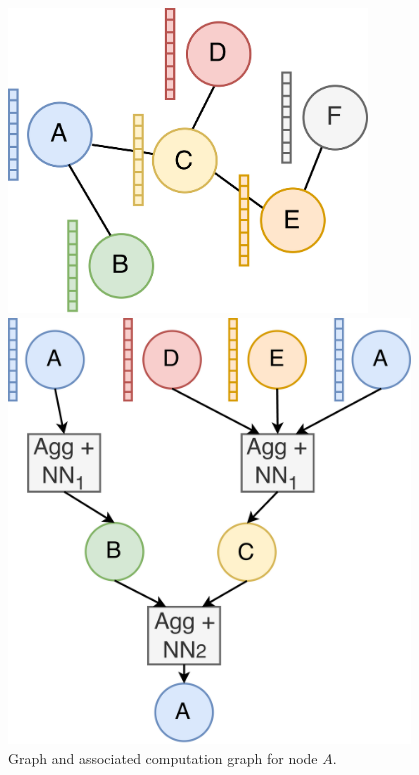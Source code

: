 \begin{figure}[h!]
    \begin{minipage}[c]{0.5\textwidth}
        \centering
        \includegraphics[width=0.85\textwidth]{diagrams/group_meeting_gnn-Graph structure.png}    
    \end{minipage}
    \hfill
    \begin{minipage}[c]{0.45\textwidth}
        \centering
        \includegraphics[width=0.95\textwidth]{diagrams/group_meeting_gnn-GNN Execution.png}
    \end{minipage}
    \caption{Graph and associated computation graph for node $A$.}
    \label{Background: GNN Execution Example}
\end{figure}    

